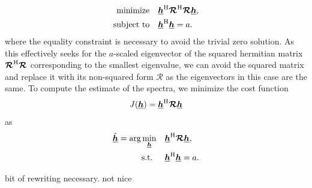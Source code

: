 \documentclass{article}
\newcommand{\hf}{\underline{\bm{h}}}
\newcommand{\Rf}{\bm{\mathcal{R}}}
\begin{document}
\begin{align}
    \operatorname{minimize} \quad & \hf^\herm \Rf^\herm \Rf \hf, \label{eq:frequency_domain:least_squares}\\
    \text{subject to} \quad & \hf^\herm \hf = a.
\end{align}
where the equality constraint is necessary to avoid the trivial zero solution.
As this effectively seeks for the \(a\)-scaled eigenvector of the squared hermitian matrix \(\Rf^\herm \Rf\) corresponding to the smallest eigenvalue, we can avoid the squared matrix and replace it with its non-squared form \(\Rf\) as the eigenvectors in this case are the same.
To compute the estimate of the spectra, we minimize the cost function
\begin{equation}
    J(\hf) = \hf^\herm \Rf \hf\label{eq:frequency_domain:cost_function}
\end{equation}
as
\begin{align}
    \hat{\hf} = \arg \min_{\hf} \quad &\hf^\herm \Rf \hf, \label{eq:frequency_domain:min_prob}\\
    \text{s.t. } \quad &\hf^\herm \hf = a.
\end{align}
\begin{attention}
    bit of rewriting necessary. not nice
\end{attention}

\end{document}
